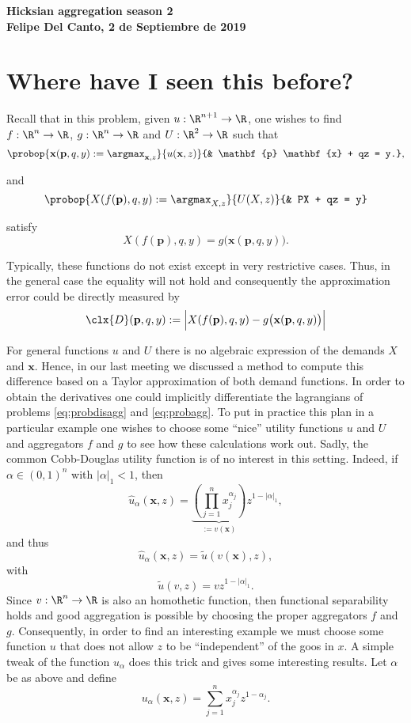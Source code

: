\documentclass[english, a4paper,12pt]{article}
\begin{document}
\begin{center} \bf \large
	Hicksian aggregation season 2 \\ Felipe Del Canto, 2 de Septiembre de 2019
\end{center}

\section{Where have I seen this before?}
Recall that in this problem, given $u : \R^{n+1} \to \R$, one wishes to find $f: \R^{n} \to \R$, $g: \R^{n} \to \R$ and $U: \R^{2} \to \R$ such that
	\begin{equation} \label{eq:probdisagg}
		\probop{\mathbf{x}(\mathbf{p}, q, y) 
			:= \argmax_{\mathbf{x}, z}}{u(\mathbf{x}, z)}
				{&	\mathbf{p} \mathbf{x} + qz = y.},
	\end{equation} 

and
	\begin{equation} \label{eq:probagg}
		\probop{X(f(\mathbf{p}), q, y) := \argmax_{X, z}}{U(X,z)}
										{&	PX + qz = y}
	\end{equation}

satisfy
	$$X(f(\mathbf{p}), q, y) = g\big(\mathbf{x}(\mathbf{p}, q, y)\big).$$
 
Typically, these functions do not exist except in very restrictive cases. Thus, in the general case the equality will not hold and consequently the approximation error could be directly measured by
	$$\clx{D}(\mathbf{p}, q,y) := \Big|X(f(\mathbf{p}), q, y) - g\big(\mathbf{x}(\mathbf{p}, q, y)\big)\Big|$$

For general functions $u$ and $U$ there is no algebraic expression of the demands $X$ and $\mathbf{x}$. Hence, in our last meeting we discussed a method to compute this difference based on a Taylor approximation of both demand functions. In order to obtain the derivatives one could implicitly differentiate the lagrangians of problems \eqref{eq:probdisagg} and \eqref{eq:probagg}. To put in practice this plan in a particular example one wishes to choose some ``nice'' utility functions $u$ and $U$ and aggregators $f$ and $g$ to see how these calculations work out. Sadly, the common Cobb-Douglas utility function is of no interest in this setting. Indeed, if $\alpha \in (0,1)^{n}$ with $|\alpha|_{1} < 1$, then
	$$\hat{u}_{\alpha}(\mathbf{x}, z) = \underbrace{\left(\prod_{j=1}^{n} x_{j}^{\alpha_{j}}\right)}_{:= v(\mathbf{x})}z^{1-|\alpha|_{1}},$$
and thus
	$$\hat{u}_{\alpha}(\mathbf{x},z) = \tilde{u}(v(\mathbf{x}), z),$$
with
	$$\tilde{u}(v,z) = vz^{1-|\alpha|_{1}}.$$
Since $v: \R^{n} \to \R$ is also an homothetic function, then functional separability holds and good aggregation is possible by choosing the proper aggregators $f$ and $g$. Consequently, in order to find an interesting example we must choose some function $u$ that does not allow $z$ to be ``independent'' of the goos in $x$. A simple tweak of the function $u_{\alpha}$ does this trick and gives some interesting results. Let $\alpha$ be as above and define
	\begin{equation} \label{eq:sumCD}
		u_{\alpha}(\mathbf{x},z) = \sum_{j=1}^{n} x_{j}^{\alpha_{j}}z^{1-\alpha_{j}}.
	\end{equation}
\end{document}

